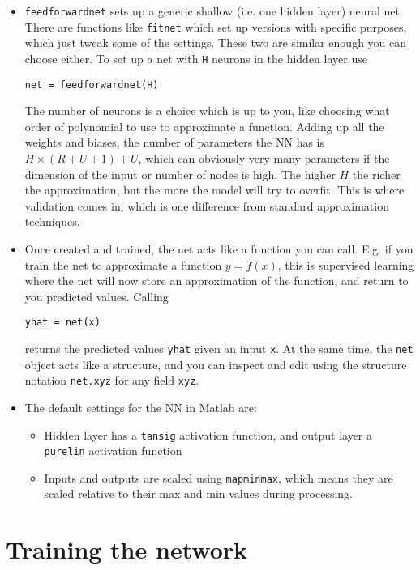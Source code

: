 \documentclass[a4paper,12pt]{article}
\newcommand{\code}[1]{\texttt{#1}}
\begin{document}
\begin{itemize}
\item \code{feedforwardnet} sets up a generic shallow (i.e. one hidden layer) neural net. There are functions like \code{fitnet} which set up versions with specific purposes, which just tweak some of the settings. These two are similar enough you can choose either. To set up a net with \code{H} neurons in the hidden layer use

\code{net = feedforwardnet(H)}

The number of neurons is a choice which is up to you, like choosing what order of polynomial to use to approximate a function. Adding up all the weights and biases, the number of parameters the NN has is $H \times (R + U +1) + U$, which can obviously very many parameters if the dimension of the input or number of nodes is high. The higher $H$ the richer the approximation, but the more the model will try to overfit. This is where validation comes in, which is one difference from standard approximation techniques. 

\item Once created and trained, the net acts like a function you can call. E.g. if you train the net to approximate a function $y=f(x)$, this is supervised learning where the net will now store an approximation of the function, and return to you predicted values. Calling

\code{yhat = net(x)}

returns the predicted values \code{yhat} given an input \code{x}. At the same time, the \code{net} object acts like a structure, and you can inspect and edit using the structure notation \code{net.xyz} for any field \code{xyz}. 

\item The default settings for the NN in Matlab are:
\begin{itemize}
\item Hidden layer has a \code{tansig} activation function, and output layer a \code{purelin} activation function
\item Inputs and outputs are scaled using \code{mapminmax}, which means they are scaled relative to their max and min values during processing. 
\end{itemize}
\end{itemize}



\section{Training the network}
\end{document}
